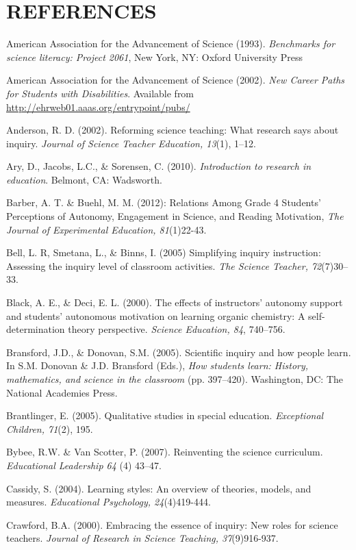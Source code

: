 \documentclass[11.5pt]{sig-alternate} %
\begin{document}
\section*{REFERENCES}\par 

\leftskip 0.25in
\parindent -0.25in 
American Association for the Advancement of Science (1993). \textit{Benchmarks for science literacy: Project 2061}, New York, NY: Oxford University Press

American Association for the Advancement of Science (2002). \textit{New Career Paths for Students with Disabilities}. Available from \url{http://ehrweb01.aaas.org/entrypoint/pubs/}

Anderson, R. D. (2002). Reforming science teaching: What research says about inquiry. \textit{Journal of Science Teacher Education, 13}(1), 1–12.

Ary, D., Jacobs, L.C., \& Sorensen, C. (2010). \textit{Introduction to research in education}.  Belmont, CA: Wadsworth.

Barber, A. T. \& Buehl, M. M. (2012): Relations Among Grade 4 Students’ Perceptions of Autonomy, Engagement in Science, and Reading Motivation, \textit{The Journal of Experimental Education, 81}(1)22-43.

Bell, L. R, Smetana, L., \& Binns, I.  (2005) Simplifying inquiry instruction: Assessing the inquiry level of classroom activities. \textit{The Science Teacher, 72}(7)30–33.

Black, A. E., \& Deci, E. L. (2000). The effects of instructors’ autonomy support and students’ autonomous motivation on learning organic chemistry: A self-determination theory perspective. \textit{Science Education, 84}, 740–756.

Bransford, J.D., \& Donovan, S.M. (2005). Scientific inquiry and how people learn. In S.M. Donovan \&
J.D. Bransford (Eds.), \textit{How students learn: History, mathematics, and science in the classroom} (pp. 397–420). Washington, DC: The National Academies Press.

Brantlinger, E. (2005). Qualitative studies in special education. \textit{Exceptional Children, 71}(2), 195. 

Bybee, R.W. \& Van Scotter, P. (2007). Reinventing the science curriculum. \textit{Educational Leadership 64} (4) 43–47.

Cassidy, S. (2004). Learning styles: An overview of theories, models, and measures. \textit{Educational Psychology, 24}(4)419-444. 

Crawford, B.A. (2000). Embracing the essence of inquiry: New roles for science teachers. \textit{Journal of Research in Science Teaching, 37}(9)916-937.  
\end{document}
